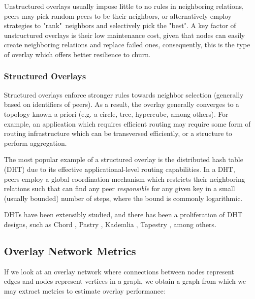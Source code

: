 Unstructured overlays usually impose little to no rules in neighboring relations, peers may pick random peers to be their neighbors, or alternatively employ strategies to "rank"\ neighbors and selectively pick the "best". A key factor of unstructured overlays is their low maintenance cost, given that nodes can easily create neighboring relations and replace failed ones, consequently, this is the type of overlay which offers better resilience to churn.

\subsubsection*{Structured Overlays}

Structured overlays enforce stronger rules towards neighbor selection (generally based on identifiers of peers). As a result, the overlay generally converges to a topology known a priori (e.g. a circle, tree, hypercube, among others). For example, an application which requires efficient routing may require some form of routing infrastructure which can be transversed efficiently, or a structure to perform aggregation. 

The most popular example of a structured overlay is the distributed hash table (DHT) due to its effective applicational-level routing capabilities. In a DHT, peers employ a global coordination mechanism which restricts their neighboring relations such that can find  any peer \textit{responsible} for any given key in a small (usually bounded) number of steps, where the bound is commonly logarithmic.

DHTs have been extensibly studied, and there has been a proliferation of DHT designs, such as Chord \cite{stoica2003chord}, Pastry \cite{rowstron2001pastry}, Kademlia \cite{maymounkov2002kademlia}, Tapestry \cite{tapestry}, among others.

\subsection{Overlay Network Metrics}

If we look at an overlay network where connections between nodes represent edges and nodes represent vertices in a graph, we obtain a graph from which we may extract metrics to estimate overlay performance:

